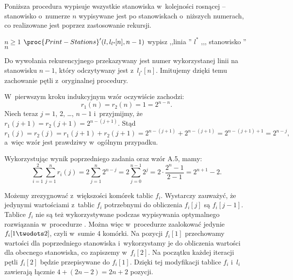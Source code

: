 
\exercise %
Poniższa procedura wypisuje wszystkie stanowiska w~kolejności rosnącej -- stanowisko o~numerze $n$ wypisywane jest po stanowiskach o~niższych numerach, co realizowane jest poprzez zastosowanie rekursji.
\begin{codebox}
\li	\If $n\ge1$
\li	\Then $\proc{Print-Stations}'(l,l_{l^*\!}[n],n-1)$
\li		wypisz ,,linia '' $l^*\!$ ,,{}, stanowisko '' $n$
	\End
\end{codebox}
Do wywołania rekurencyjnego przekazywany jest numer wykorzystanej linii na stanowisku $n-1$, który odczytywany jest z~$l_{l^*\!}[n]$.
Imitujemy dzięki temu zachowanie pętli z~oryginalnej procedury.

\exercise %
W~pierwszym kroku indukcyjnym wzór oczywiście zachodzi:
\[
	r_1(n) = r_2(n) = 1 = 2^{n-n}.
\]
Niech teraz $j=1$, 2, \dots, $n-1$ i~przyjmijmy, że $r_1(j+1)=r_2(j+1)=2^{n-(j+1)}$.
Stąd
\[
	r_1(j) = r_2(j) = r_1(j+1)+r_2(j+1) = 2^{n-(j+1)}+2^{n-(j+1)} = 2^{n-(j+1)+1} = 2^{n-j},
\]
a~więc wzór jest prawdziwy w~ogólnym przypadku.

\exercise %
Wykorzystując wynik poprzedniego zadania oraz wzór A.5, mamy:
\[
	\sum_{i=1}^2\sum_{j=1}^nr_i(j) = 2\sum_{j=1}^n2^{n-j} = 2\sum_{j=0}^{n-1}2^j = 2\cdot\frac{2^n-1}{2-1} = 2^{n+1}-2.
\]

\exercise %
Możemy zrezygnować z~większości komórek tablic $f_i$.
Wystarczy zauważyć, że jedynymi wartościami z~tablic $f_i$ potrzebnymi do obliczenia $f_i[j]$ są $f_i[j-1]$.
Tablice $f_i$ nie są też wykorzystywane podczas wypisywania optymalnego rozwiązania w~procedurze .
Można więc w~procedurze  zaalokować jedynie $f_i[1\twodots2]$, czyli w~sumie 4 komórki.
Na pozycji $f_i[1]$ przechowamy wartości dla poprzedniego stanowiska i~wykorzystamy je do obliczenia wartości dla obecnego stanowiska, co zapiszemy w~$f_i[2]$.
Na początku każdej iteracji pętli  $f_i[2]$ będzie przepisywane do $f_i[1]$.
Dzięki tej modyfikacji tablice $f_i$ i~$l_i$ zawierają łącznie $4+(2n-2)=2n+2$ pozycji.

\exercise %
